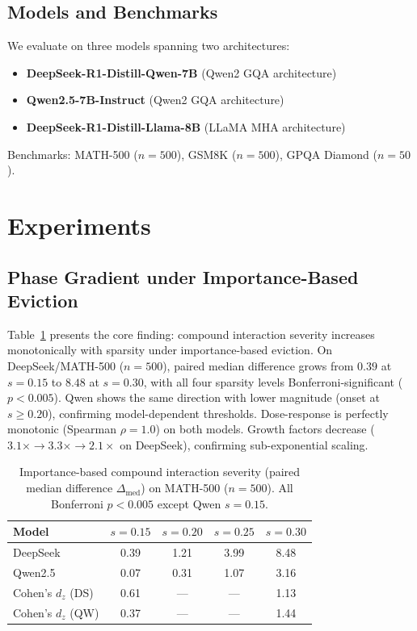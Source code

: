 \documentclass[11pt,a4paper]{article}
\begin{document}
\subsection{Models and Benchmarks}
We evaluate on three models spanning two architectures:
\begin{itemize}
\item \textbf{DeepSeek-R1-Distill-Qwen-7B} (Qwen2 GQA architecture)
\item \textbf{Qwen2.5-7B-Instruct} (Qwen2 GQA architecture)
\item \textbf{DeepSeek-R1-Distill-Llama-8B} (LLaMA MHA architecture)
\end{itemize}
Benchmarks: MATH-500 ($n\!=\!500$), GSM8K ($n\!=\!500$), GPQA Diamond ($n\!=\!50$).

\section{Experiments}
\label{sec:experiments}

\subsection{Phase Gradient under Importance-Based Eviction}
\label{sec:phase_gradient}

Table~\ref{tab:main_results} presents the core finding: compound interaction severity increases monotonically with sparsity under importance-based eviction.
On DeepSeek/MATH-500 ($n\!=\!500$), paired median difference grows from $0.39$ at $s\!=\!0.15$ to $8.48$ at $s\!=\!0.30$, with all four sparsity levels Bonferroni-significant ($p < 0.005$).
Qwen shows the same direction with lower magnitude (onset at $s \geq 0.20$), confirming model-dependent thresholds.
Dose-response is perfectly monotonic (Spearman $\rho = 1.0$) on both models.
Growth factors decrease ($3.1\times \to 3.3\times \to 2.1\times$ on DeepSeek), confirming sub-exponential scaling.

\begin{table}[t]
\centering
\small
\caption{Importance-based compound interaction severity (paired median difference $\Delta_{\mathrm{med}}$) on MATH-500 ($n\!=\!500$). All Bonferroni $p < 0.005$ except Qwen $s\!=\!0.15$.}
\label{tab:main_results}
\begin{tabular}{@{}lcccc@{}}
\toprule
Model & $s\!=\!0.15$ & $s\!=\!0.20$ & $s\!=\!0.25$ & $s\!=\!0.30$ \\
\midrule
DeepSeek & 0.39 & 1.21 & 3.99 & 8.48 \\
Qwen2.5 & 0.07 & 0.31 & 1.07 & 3.16 \\
\midrule
Cohen's $d_z$ (DS) & 0.61 & --- & --- & 1.13 \\
Cohen's $d_z$ (QW) & 0.37 & --- & --- & 1.44 \\
\bottomrule
\end{tabular}
\end{table}
\end{document}
